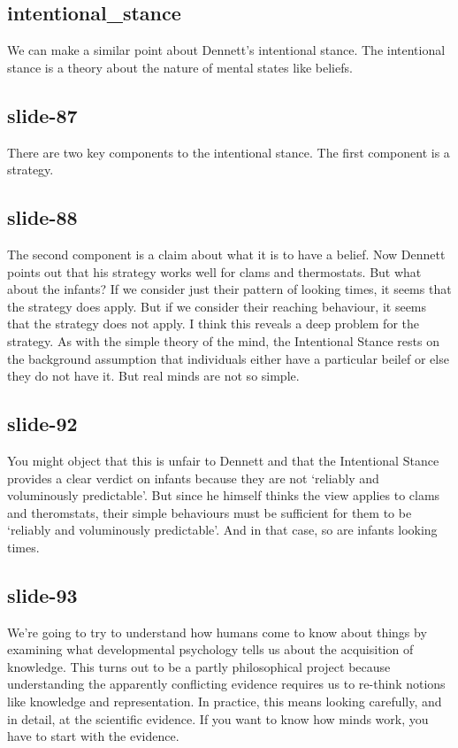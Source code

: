 \documentclass[12pt,\papersize]{extarticle}
\begin{document}
 
\subsection{intentional\_stance}
We can make a similar point about Dennett's intentional stance.
The intentional stance is a theory about the nature of mental states like beliefs.
 
 
\subsection{slide-87}
There are two key components to the intentional stance.
The first component is a strategy.
 
 
\subsection{slide-88}
The second component is a claim about what it is to have a belief.
Now Dennett points out that his strategy works well for clams and thermostats.
But what about the infants?
If we consider just their pattern of looking times, it seems that the strategy does apply.
But if we consider their reaching behaviour, it seems that the strategy does not apply.
I think this reveals a deep problem for the strategy.
As with the simple theory of the mind, the Intentional Stance rests on the background assumption that individuals either have a particular beilef or else they do not have it.
But real minds are not so simple.
 
 
\subsection{slide-92}
You might object that this is unfair to Dennett and that the Intentional Stance provides a clear verdict on infants because they are not ‘reliably and voluminously predictable’.
But since he himself thinks the view applies to clams and theromstats, their simple behaviours must be sufficient for them to be ‘reliably and voluminously predictable’.
And in that case, so are infants looking times.
 
 
\subsection{slide-93}
We're going to try to understand how humans come to know about things by examining what developmental psychology tells us about the acquisition of knowledge.
This turns out to be a partly philosophical project because understanding the apparently conflicting evidence requires us to re-think notions like knowledge and representation.
In practice, this means looking carefully, and in detail, at the scientific evidence.
If you want to know how minds work, you have to start with the evidence.
 
\end{document}

